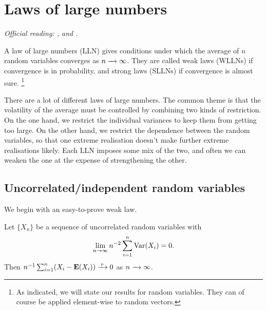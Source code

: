 \documentclass[11pt,letterpaper,reqno,oneside]{article}
\begin{document}
\pagebreak
\section{Laws of large numbers}
\label{sec:LLNs}

\emph{%
Official reading: \textcite[][ch. 3]{Amemiya1985}, \textcite[][ch. 2]{Rao1973} and \textcite[][ch. 3]{White2001}.}

A law of large numbers (LLN) gives conditions under which the average of $n$ random variables converges as $n \xrightarrow{\;\;\;} \infty$. They are called weak laws (WLLNs) if convergence is in probability, and strong laws (SLLNs) if convergence is almost sure.%
	\footnote{As indicated, we will state our results for random variables. They can of course be applied element-wise to random vectors.}

There are a lot of different laws of large numbers. The common theme is that the volatility of the average must be controlled by combining two kinds of restriction. On the one hand, we restrict the individual variances to keep them from getting too large. On the other hand, we restrict the dependence between the random variables, so that one extreme realisation doesn't make further extreme realisations likely. Each LLN imposes some mix of the two, and often we can weaken the one at the expense of strengthening the other.



\subsection{Uncorrelated/independent random variables}
\label{sec:LLNs:independence_variance_restrictions}

We begin with an easy-to-prove weak law.
%
\begin{theorem}
	Let $\{ X_n \}$ be a sequence of uncorrelated random variables with
	\begin{equation*}
		\lim_{n\to\infty} n^{-2} \sum_{i=1}^n \mathrm{Var}(X_i) = 0 .
	\end{equation*}
	Then $n^{-1} \sum_{i=1}^n (X_i-\mathbf{E}(X_i)) \xrightarrow{{\scriptscriptstyle \mathrm{\;p\;}}} 0$ as $n\xrightarrow{\;\;\;}\infty$.
\end{theorem}
\end{document}
